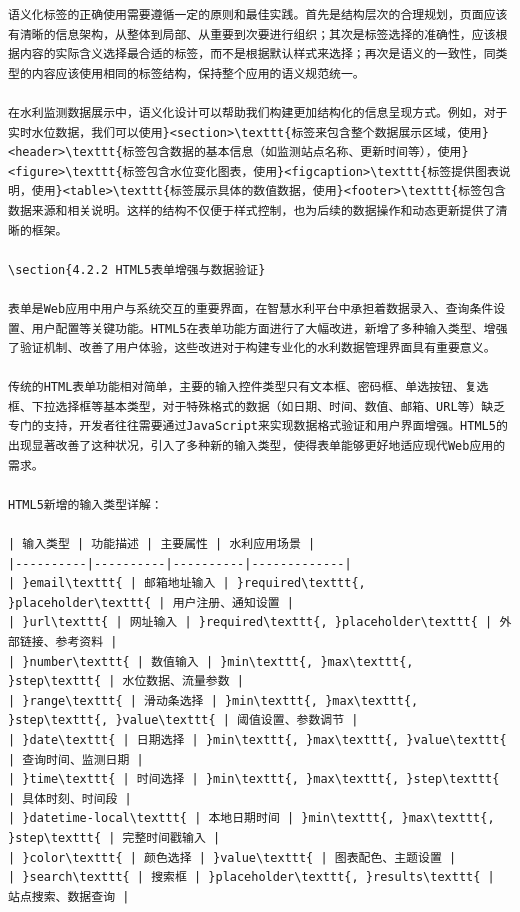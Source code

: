 \begin{lstlisting}
语义化标签的正确使用需要遵循一定的原则和最佳实践。首先是结构层次的合理规划，页面应该有清晰的信息架构，从整体到局部、从重要到次要进行组织；其次是标签选择的准确性，应该根据内容的实际含义选择最合适的标签，而不是根据默认样式来选择；再次是语义的一致性，同类型的内容应该使用相同的标签结构，保持整个应用的语义规范统一。

在水利监测数据展示中，语义化设计可以帮助我们构建更加结构化的信息呈现方式。例如，对于实时水位数据，我们可以使用}<section>\texttt{标签来包含整个数据展示区域，使用}<header>\texttt{标签包含数据的基本信息（如监测站点名称、更新时间等），使用}<figure>\texttt{标签包含水位变化图表，使用}<figcaption>\texttt{标签提供图表说明，使用}<table>\texttt{标签展示具体的数值数据，使用}<footer>\texttt{标签包含数据来源和相关说明。这样的结构不仅便于样式控制，也为后续的数据操作和动态更新提供了清晰的框架。

\section{4.2.2 HTML5表单增强与数据验证}

表单是Web应用中用户与系统交互的重要界面，在智慧水利平台中承担着数据录入、查询条件设置、用户配置等关键功能。HTML5在表单功能方面进行了大幅改进，新增了多种输入类型、增强了验证机制、改善了用户体验，这些改进对于构建专业化的水利数据管理界面具有重要意义。

传统的HTML表单功能相对简单，主要的输入控件类型只有文本框、密码框、单选按钮、复选框、下拉选择框等基本类型，对于特殊格式的数据（如日期、时间、数值、邮箱、URL等）缺乏专门的支持，开发者往往需要通过JavaScript来实现数据格式验证和用户界面增强。HTML5的出现显著改善了这种状况，引入了多种新的输入类型，使得表单能够更好地适应现代Web应用的需求。

HTML5新增的输入类型详解：

| 输入类型 | 功能描述 | 主要属性 | 水利应用场景 |
|----------|----------|----------|-------------|
| }email\texttt{ | 邮箱地址输入 | }required\texttt{, }placeholder\texttt{ | 用户注册、通知设置 |
| }url\texttt{ | 网址输入 | }required\texttt{, }placeholder\texttt{ | 外部链接、参考资料 |
| }number\texttt{ | 数值输入 | }min\texttt{, }max\texttt{, }step\texttt{ | 水位数据、流量参数 |
| }range\texttt{ | 滑动条选择 | }min\texttt{, }max\texttt{, }step\texttt{, }value\texttt{ | 阈值设置、参数调节 |
| }date\texttt{ | 日期选择 | }min\texttt{, }max\texttt{, }value\texttt{ | 查询时间、监测日期 |
| }time\texttt{ | 时间选择 | }min\texttt{, }max\texttt{, }step\texttt{ | 具体时刻、时间段 |
| }datetime-local\texttt{ | 本地日期时间 | }min\texttt{, }max\texttt{, }step\texttt{ | 完整时间戳输入 |
| }color\texttt{ | 颜色选择 | }value\texttt{ | 图表配色、主题设置 |
| }search\texttt{ | 搜索框 | }placeholder\texttt{, }results\texttt{ | 站点搜索、数据查询 |


\end{lstlisting}
